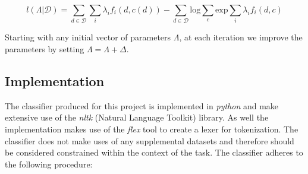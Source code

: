 \documentclass[12pt]{article}
\begin{document}
\begin{equation}
    l(\Lambda | \mathcal{D}) = \sum\limits_{d\in\mathcal{D}} \sum\limits_{i}
    \lambda_{i} f_{i}(d,c(d)) - \sum\limits_{d\in\mathcal{D}} \mathrm{log}
    \sum\limits_{c} \mathrm{exp} \sum\limits_{i} \lambda_{i} f_{i}(d,c)
\end{equation}

Starting with any initial vector of parameters $\Lambda$, at each iteration
we improve the parameters by setting $\Lambda = \Lambda + \Delta$.


\subsection{Implementation}

The classifier produced for this project is implemented in \textit{python} and
make extensive use of the \textit{nltk} (Natural Language Toolkit) library. As
well the implementation makes use of the \textit{flex} tool to create a lexer
for tokenization. The classifier does not make uses of any supplemental
datasets and therefore should be considered constrained within the context of
the task. The classifier adheres to the following procedure:
\end{document}
